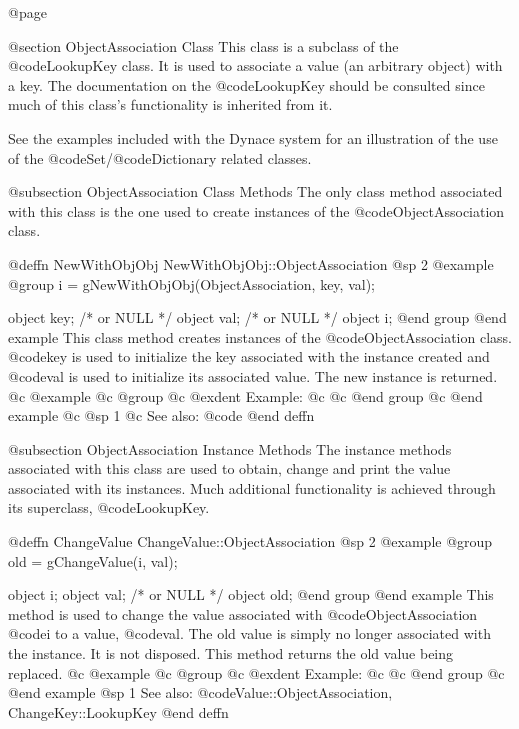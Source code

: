 @page

@section ObjectAssociation Class
This class is a subclass of the @code{LookupKey} class.  It is used to
associate a value (an arbitrary object) with a key.  The documentation
on the @code{LookupKey} should be consulted since much of this class's
functionality is inherited from it.


See the examples included with the Dynace system for an illustration of the
use of the @code{Set}/@code{Dictionary} related classes.


@subsection ObjectAssociation Class Methods
The only class method associated with this class is the one used to
create instances of the @code{ObjectAssociation} class.





@deffn {NewWithObjObj} NewWithObjObj::ObjectAssociation
@sp 2
@example
@group
i = gNewWithObjObj(ObjectAssociation, key, val);

object  key;    /*  or NULL   */
object  val;    /*  or NULL   */
object  i;
@end group
@end example
This class method creates instances of the @code{ObjectAssociation} class.
@code{key} is used to initialize the key associated with the instance
created and @code{val} is used to initialize its associated value.  The
new instance is returned.
@c @example
@c @group
@c @exdent Example:
@c 
@c @end group
@c @end example
@c @sp 1
@c See also:  @code{}
@end deffn




@subsection ObjectAssociation Instance Methods
The instance methods associated with this class are used to obtain,
change and print the value associated with its instances.  Much
additional functionality is achieved through its superclass,
@code{LookupKey}.







@deffn {ChangeValue} ChangeValue::ObjectAssociation
@sp 2
@example
@group
old = gChangeValue(i, val);

object  i;
object  val;    /*  or NULL   */
object  old;
@end group
@end example
This method is used to change the value associated with @code{ObjectAssociation}
@code{i} to a value, @code{val}.  The old value is simply no longer
associated with the instance.  It is not disposed.  This method
returns the old value being replaced.
@c @example
@c @group
@c @exdent Example:
@c 
@c @end group
@c @end example
@sp 1
See also:  @code{Value::ObjectAssociation, ChangeKey::LookupKey}
@end deffn




